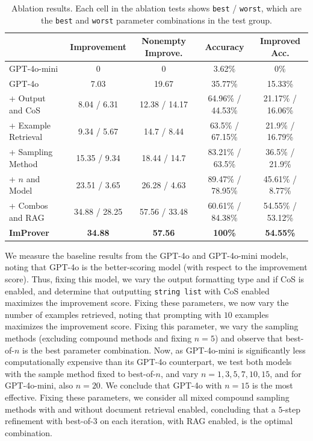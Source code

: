 \begin{table}[h]
\caption{Ablation results. Each cell in the ablation tests shows \texttt{best} / \texttt{worst}, which are the \texttt{best} and \texttt{worst} parameter combinations in the test group.}
\label{tab:abl}
\centering
\small
\begin{tabular}{l|cccc}
\toprule
& Improvement & Nonempty Improve. & Accuracy & Improved Acc.\\
\midrule
GPT-4o-mini & 0 & 0 & 3.62\% & 0\%\\
GPT-4o & 7.03 & 19.67 & 35.77\% & 15.33\%\\
+ Output and CoS & 8.04 / 6.31 & 12.38 / 14.17 & 64.96\% / 44.53\% & 21.17\% / 16.06\% \\
+ Example Retrieval & 9.34 / 5.67 & 14.7 / 8.44 & 63.5\% / 67.15\% & 21.9\% / 16.79\% \\
+ Sampling Method & 15.35 / 9.34 & 18.44 / 14.7 & 83.21\% / 63.5\% & 36.5\% / 21.9\% \\
+ $n$ and Model & 23.51 / 3.65 & 26.28 / 4.63 & 89.47\% / 78.95\% & 45.61\% / 8.77\% \\
+ Combos and RAG & 34.88 / 28.25 & 57.56 / 33.48 & 60.61\% / 84.38\% & 54.55\% / 53.12\% \\
\midrule
\textbf{ImProver} & \textbf{34.88} & \textbf{57.56} & \textbf{100\%} & \textbf{54.55\%}\\
\bottomrule
\end{tabular}
\end{table}

We measure the baseline results from the GPT-4o and GPT-4o-mini models, noting that GPT-4o is the better-scoring model (with respect to the improvement score). Thus, fixing this model, we vary the output formatting type and if CoS is enabled, and determine that outputting \texttt{string list} with CoS enabled maximizes the improvement score. Fixing these parameters, we now vary the number of examples retrieved, noting that prompting with $10$ examples maximizes the improvement score. Fixing this parameter, we vary the sampling methods (excluding compound methods and fixing $n=5$) and observe that best-of-$n$ is the best parameter combination. Now, as GPT-4o-mini is significantly less computationally expensive than its GPT-4o counterpart, we test both models with the sample method fixed to best-of-$n$, and vary $n=1,3,5,7,10,15$, and for GPT-4o-mini, also $n=20$. We conclude that GPT-4o with $n=15$ is the most effective. Fixing these parameters, we consider all mixed compound sampling methods with and without document retrieval enabled, concluding that a $5$-step refinement with best-of-$3$ on each iteration, with RAG enabled, is the optimal combination.

